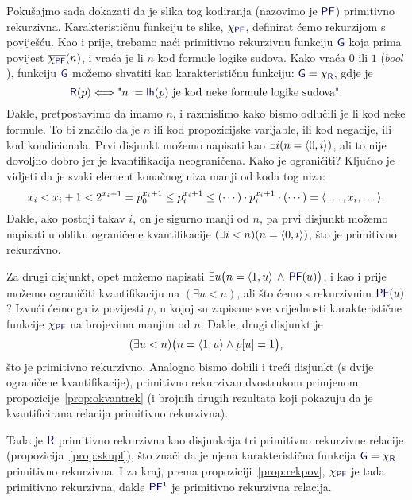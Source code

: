 \begin{primjer}[{name=[primitivna rekurzivnost skupa svih formula logike sudova]}]
Pokušajmo sada dokazati da je slika tog kodiranja (nazovimo je $\f{PF}$) primitivno rekurzivna. Karakterističnu funkciju te slike, $\chi_{\f{PF}}$, definirat ćemo rekurzijom s poviješću. Kao i prije, trebamo naći primitivno rekurzivnu funkciju $\f G$ koja prima povijest $\overline{\chi_{\f{PF}}}(n)$, i vraća je li $n$ kod formule logike sudova. Kako vraća $0$ ili $1$ ($bool$), funkciju $\f G$ možemo shvatiti kao karakterističnu funkciju: $\f G=\chi_{\f R}$, gdje je
\begin{equation}
    \f R(p)\Longleftrightarrow\text{"$n:=\f{lh}(p)$ je kod neke formule logike sudova".}
\end{equation}
Dakle, pretpostavimo da imamo $n$, i razmislimo kako bismo odlučili je li kod neke formule. To bi značilo da je $n$ ili kod propozicijske varijable, ili kod negacije, ili kod kondicionala. Prvi disjunkt možemo napisati kao $\exists i(n=\langle0,i\rangle)$, ali to nije dovoljno dobro jer je kvantifikacija neograničena. Kako je ograničiti? Ključno je vidjeti da je svaki element konačnog niza manji od koda tog niza:
\begin{equation}\label{eq:elem<kod}
    x_i<x_i+1<2^{x_i+1}=p_0^{x_i+1}\le p_i^{x_i+1}\le(\dotsb)\cdot p_i^{x_i+1}\cdot(\dotsb)=\langle\,\dotsc,x_i,\dotsc\rangle\text.
\end{equation}
Dakle, ako postoji takav $i$, on je sigurno manji od $n$, pa prvi disjunkt možemo napisati u obliku ograničene kvantifikacije $(\exists i<n)(n=\langle0,i\rangle)$, što je primitivno rekurzivno.

    Za drugi disjunkt, opet možemo napisati $\exists u\bigl(n\eq\langle1,u\rangle\,\land\,\f{PF}(u)\bigr)$, i kao i prije možemo ograničiti kvantifikaciju na $(\exists u<n)$, ali što ćemo s rekurzivnim $\f{PF}(u)$? Izvući ćemo ga iz povijesti $p$, u kojoj su zapisane sve vrijednosti karakteristične funkcije $\chi_{\f{PF}}$ na brojevima manjim od $n$. Dakle, drugi disjunkt je
\begin{equation}
    (\exists u<n)\bigl(n=\langle1,u\rangle\land p[u]=1\bigr)\text,
\end{equation}
što je primitivno rekurzivno. Analogno bismo dobili i treći disjunkt (s dvije ograničene kvantifikacije),  primitivno rekurzivan dvostrukom primjenom propozicije~\ref{prop:okvantrek} (i brojnih drugih rezultata koji pokazuju da je kvantificirana relacija primitivno rekurzivna).

Tada je $\f R$ primitivno rekurzivna kao disjunkcija tri primitivno rekurzivne relacije (propozicija~\ref{prop:skupl}), što znači da je njena karakteristična funkcija $\f G=\chi_{\f R}$ primitivno rekurzivna. I za kraj, prema propoziciji~\ref{prop:rekpov}, $\chi_{\f{PF}}$ je tada primitivno rekurzivna, dakle $\f{PF}^1$ je primitivno rekurzivna relacija.
\end{primjer}

